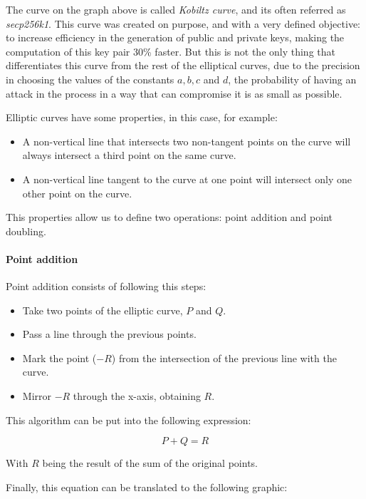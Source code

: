 \documentclass{article}
\newcommand\tab[1][1cm]{\hspace*{#1}}
\begin{document}
The curve on the graph above is called \textit{Kobiltz curve}, and its often referred as \textit{secp256k1}. This curve was created on purpose, and with a very defined objective: to increase efficiency in the generation of public and private keys, making the computation of this key pair 30\% faster. But this is not the only thing that differentiates this curve from the rest of the elliptical curves, due to the precision in choosing the values of the constants \(a, b, c\) and \(d\), the probability of having an attack in the process in a way that can compromise it is as small as possible.

Elliptic curves have some properties, in  this case, for example:

\begin{itemize}
    \item A non-vertical line that intersects two non-tangent points on the curve will always intersect a third point on the same curve.
    \item A non-vertical line tangent to the curve at one point will intersect only one other point on the curve.
\end{itemize}

This properties allow us to define two operations: point addition and point doubling.

\paragraph{Point addition}

\tab Point addition consists of following this steps:

\begin{itemize}
    \item Take two points of the elliptic curve, \(P\) and \(Q\).
    \item Pass a line through the previous points.
    \item Mark the point (\(-R\)) from the intersection of the previous line with the curve.
    \item Mirror \(-R\) through the x-axis, obtaining \(R\).
\end{itemize}

This algorithm can be put into the following expression:

\[P + Q = R\]

With \(R\) being the result of the sum of the original points.

Finally, this equation can be translated to the following graphic:
\end{document}
